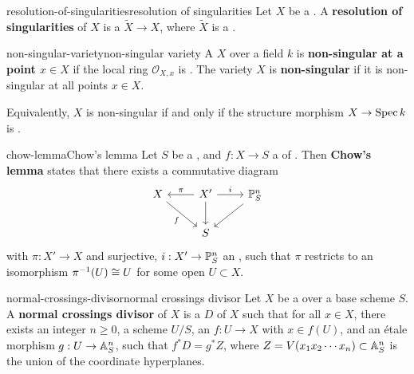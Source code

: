 \begin{topic}{resolution-of-singularities}{resolution of singularities}
    Let $X$ be a . A \textbf{resolution of singularities} of $X$ is a   $\widetilde{X} \to X$, where $\widetilde{X}$ is a .
\end{topic}

\begin{topic}{non-singular-variety}{non-singular variety}
    A  $X$ over a field $k$ is \textbf{non-singular at a point $x \in X$} if the local ring $\mathcal{O}_{X, x}$ is . The variety $X$ is \textbf{non-singular} if it is non-singular at all points $x \in X$.
    
    Equivalently, $X$ is non-singular if and only if the structure morphism $X \to \Spec k$ is .
\end{topic}

\begin{topic}{chow-lemma}{Chow's lemma}
    Let $S$ be a  , and $f : X \to S$ a  of . Then \textbf{Chow's lemma} states that there exists a commutative diagram
    \[ \begin{tikzcd}
        X \arrow[swap]{dr}{f} & X' \arrow[swap]{l}{\pi} \arrow{r}{i} \arrow{d} & \PP^n_S \arrow{dl} \\ & S &
    \end{tikzcd} \]
    with $\pi : X' \to X$  and surjective, $i : X' \to \PP^n_S$ an , such that $\pi$ restricts to an isomorphism $\pi^{-1}(U) \isom U$ for some  open $U \subset X$.
 \end{topic}

\begin{topic}{normal-crossings-divisor}{normal crossings divisor}
    Let $X$ be a  over a base scheme $S$. A \textbf{normal crossings divisor} of $X$ is a  $D$ of $X$ such that for all $x \in X$, there exists an integer $n \ge 0$, a scheme $U/S$, an  $f : U \to X$ with $x \in f(U)$, and an étale morphism $g : U \to \AA^n_S$, such that $f^* D = g^* Z$, where $Z = V(x_1 x_2 \cdots x_n) \subset \AA^n_S$ is the union of the coordinate hyperplanes.
\end{topic}

